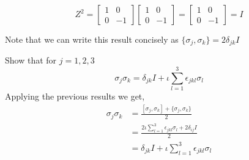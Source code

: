 \begin{example}
\[    \]
    \[
    Z^2=\begin{bmatrix} 1 & 0 \\ 0 & -1 \end{bmatrix}\begin{bmatrix} 1 & 0 \\ 0 & -1 \end{bmatrix}=\begin{bmatrix} 1 & 0 \\ 0 & -1 \end{bmatrix}=I
    \]
    \begin{remark}
        Note that we can write this result concisely as $\{\sigma_j,\sigma_k\}=2\delta_{jk}I$
    \end{remark}
\end{example}
\begin{example}
    Show that for $j=1,2,3$
    \[
    \sigma_j\sigma_k=\delta_{jk} I + \iota \sum_{l=1}^3 \epsilon_{jkl}\sigma_l
    \]
    Applying the previous results we get,
    \begin{align*}
    \sigma_j\sigma_k&=\frac{[\sigma_j,\sigma_k]+\{\sigma_j,\sigma_k\}}{2}\\
    &=\frac{2\iota \sum_{l=1}^3 \epsilon_{jkl}\sigma_l +2\delta_{ij}I}{2}\\
    &=\delta_{jk}I+\iota\sum_{l=1}^3 \epsilon_{jkl}\sigma_l
    \end{align*}
\end{example}
